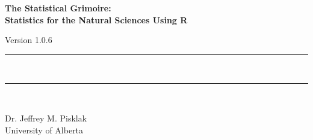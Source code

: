 {}
{
\Huge\bfseries\centering\headingfont The Statistical Grimoire: \\
Statistics for the Natural Sciences Using R\\

\vspace{0.5em}

\small\mdseries\raggedright Version 1.0.6

\rule{\linewidth}{1pt}\\[-6mm]
\rule{\linewidth}{2pt}\\

}

\vskip 2cm

\begin{center}
\Large Dr. Jeffrey M. Pisklak \\
\vspace{0.5em}
\large University of Alberta
\end{center}

\vfill

